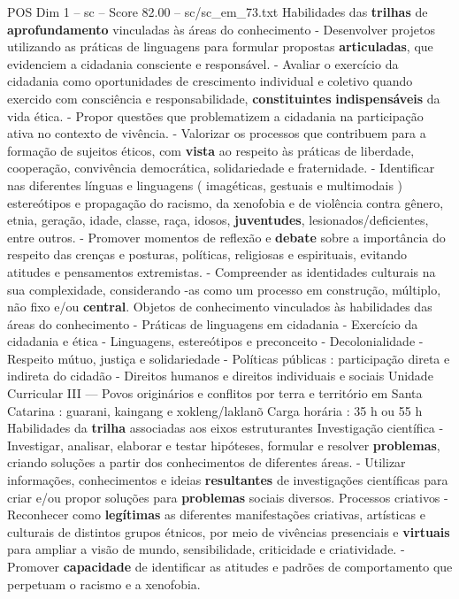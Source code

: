 \begin{textsample}{POS Dim 1 – sc – Score 82.00 – sc/sc\_em\_73.txt}
Habilidades das \textbf{trilhas} de \textbf{aprofundamento} vinculadas às áreas do conhecimento - Desenvolver projetos utilizando as práticas de linguagens para formular propostas \textbf{articuladas}, que evidenciem a cidadania consciente e responsável. - Avaliar o exercício da cidadania como oportunidades de crescimento individual e coletivo quando exercido com consciência e responsabilidade, \textbf{constituintes} \textbf{indispensáveis} da vida ética. - Propor questões que problematizem a cidadania na participação ativa no contexto de vivência. - Valorizar os processos que contribuem para a formação de sujeitos éticos, com \textbf{vista} ao respeito às práticas de liberdade, cooperação, convivência democrática, solidariedade e fraternidade. - Identificar nas diferentes línguas e linguagens ( imagéticas, gestuais e multimodais ) estereótipos e propagação do racismo, da xenofobia e de violência contra gênero, etnia, geração, idade, classe, raça, idosos, \textbf{juventudes}, lesionados/deficientes, entre outros. - Promover momentos de reflexão e \textbf{debate} sobre a importância do respeito das crenças e posturas, políticas, religiosas e espirituais, evitando atitudes e pensamentos extremistas. - Compreender as identidades culturais na sua complexidade, considerando -as como um processo em construção, múltiplo, não fixo e/ou \textbf{central}.
Objetos de conhecimento vinculados às habilidades das áreas do conhecimento - Práticas de linguagens em cidadania - Exercício da cidadania e ética - Linguagens, estereótipos e preconceito - Decolonialidade - Respeito mútuo, justiça e solidariedade - Políticas públicas : participação direta e indireta do cidadão - Direitos humanos e direitos individuais e sociais Unidade Curricular III — Povos originários e conflitos por terra e território em Santa Catarina : guarani, kaingang e xokleng/laklanõ Carga horária : 35 h ou 55 h Habilidades da \textbf{trilha} associadas aos eixos estruturantes Investigação científica - Investigar, analisar, elaborar e testar hipóteses, formular e resolver \textbf{problemas}, criando soluções a partir dos conhecimentos de diferentes áreas. - Utilizar informações, conhecimentos e ideias \textbf{resultantes} de investigações científicas para criar e/ou propor soluções para \textbf{problemas} sociais diversos.
Processos criativos - Reconhecer como \textbf{legítimas} as diferentes manifestações criativas, artísticas e culturais de distintos grupos étnicos, por meio de vivências presenciais e \textbf{virtuais} para ampliar a visão de mundo, sensibilidade, criticidade e criatividade. - Promover \textbf{capacidade} de identificar as atitudes e padrões de comportamento que perpetuam o racismo e a xenofobia.

\end{textsample}
